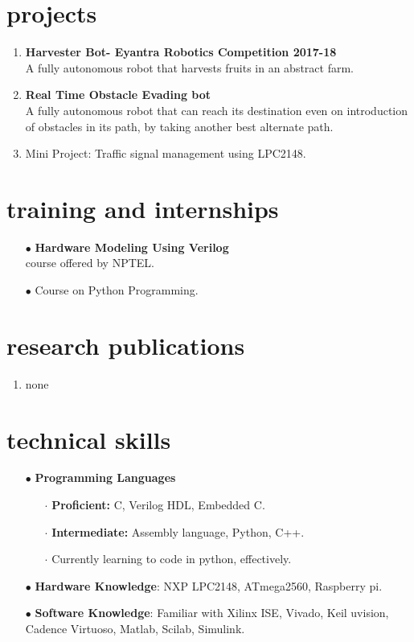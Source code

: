 \documentclass[10pt]{article}
\begin{document}
\section*{projects}
\begin{enumerate}
\item\textbf{Harvester Bot- Eyantra Robotics Competition 2017-18}\\
A fully autonomous robot that harvests fruits in an abstract farm.
\item\textbf{Real Time Obstacle Evading bot}\\
A fully autonomous robot that can reach its destination even on introduction of obstacles in its path, by taking another best alternate path.
\item Mini Project: Traffic signal management using LPC2148.
\end{enumerate}
\section*{training and internships}
\begin{itemize}
\item[$\bullet$]\textbf{Hardware Modeling Using Verilog }\\
course offered by NPTEL.
\item[$\bullet$]Course on Python Programming.
\end{itemize}
\section*{research publications}
\begin{enumerate}
\item none
\end{enumerate}
\section*{technical skills}
\begin{itemize}
\item[$\bullet$]\textbf{Programming Languages }
\begin{itemize}
\item[$\cdot$]\textbf{Proficient:} C, Verilog HDL, Embedded C.
\item[$\cdot$]\textbf{Intermediate:} Assembly language, Python, C++.
\item[$\cdot$]Currently learning to code in python, effectively.
\end{itemize}
\item[$\bullet$]\textbf{Hardware Knowledge}: NXP LPC2148, ATmega2560, Raspberry pi.
\item[$\bullet$]\textbf{Software Knowledge}: Familiar with Xilinx ISE, Vivado, Keil uvision, Cadence Virtuoso, Matlab, Scilab, Simulink.
\end{itemize}
\end{document}
